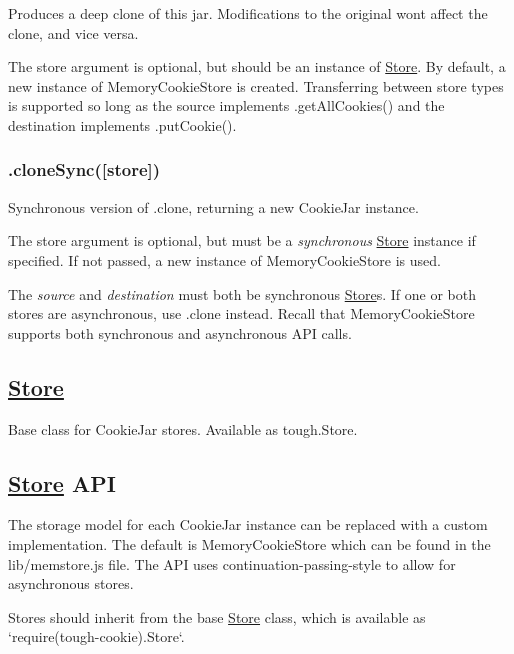 Produces a deep clone of this jar. Modifications to the original won\textquotesingle{}t affect the clone, and vice versa.

The {\ttfamily store} argument is optional, but should be an instance of {\ttfamily \hyperlink{class_store}{Store}}. By default, a new instance of {\ttfamily Memory\+Cookie\+Store} is created. Transferring between store types is supported so long as the source implements {\ttfamily .get\+All\+Cookies()} and the destination implements {\ttfamily .put\+Cookie()}.

\subsubsection*{{\ttfamily .clone\+Sync(\mbox{[}store\mbox{]})}}

Synchronous version of {\ttfamily .clone}, returning a new {\ttfamily Cookie\+Jar} instance.

The {\ttfamily store} argument is optional, but must be a {\itshape synchronous} {\ttfamily \hyperlink{class_store}{Store}} instance if specified. If not passed, a new instance of {\ttfamily Memory\+Cookie\+Store} is used.

The {\itshape source} and {\itshape destination} must both be synchronous {\ttfamily \hyperlink{class_store}{Store}}s. If one or both stores are asynchronous, use {\ttfamily .clone} instead. Recall that {\ttfamily Memory\+Cookie\+Store} supports both synchronous and asynchronous A\+P\+I calls.

\subsection*{\hyperlink{class_store}{Store}}

Base class for Cookie\+Jar stores. Available as {\ttfamily tough.\+Store}.

\subsection*{\hyperlink{class_store}{Store} A\+P\+I}

The storage model for each {\ttfamily Cookie\+Jar} instance can be replaced with a custom implementation. The default is {\ttfamily Memory\+Cookie\+Store} which can be found in the {\ttfamily lib/memstore.\+js} file. The A\+P\+I uses continuation-\/passing-\/style to allow for asynchronous stores.

Stores should inherit from the base {\ttfamily \hyperlink{class_store}{Store}} class, which is available as `require(\textquotesingle{}tough-\/cookie\textquotesingle{}).Store`.

